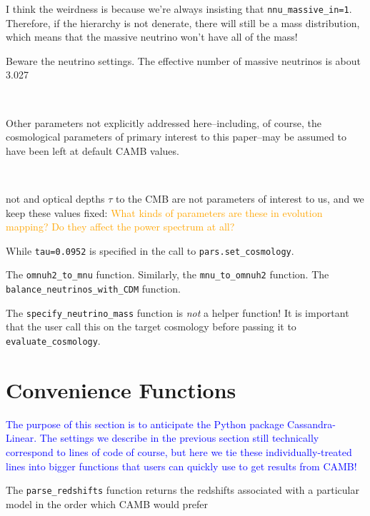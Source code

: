 I think the weirdness is because we're always
insisting that \verb|nnu_massive_in=1|. Therefore,
if the hierarchy is not denerate, there will still
be a mass distribution, which means that the 
massive neutrino won't have all of the mass!

Beware the neutrino settings. The effective number of massive neutrinos is about 3.027

\

Other parameters not explicitly addressed here--including, of course, the
cosmological parameters of primary interest to this paper--may be assumed to 
have been left at default CAMB values.

\

 not and optical depths $\tau$ to the CMB 
are not parameters of interest to us, and we keep these values fixed:
\textcolor{orange}{What kinds of parameters are these in evolution mapping?
Do they affect the power spectrum at all?}

While \verb|tau=0.0952| is specified in the call to \verb|pars.set_cosmology|.


The \verb|omnuh2_to_mnu| function. Similarly, the \verb|mnu_to_omnuh2|
function. The \verb|balance_neutrinos_with_CDM| function.


The \verb|specify_neutrino_mass| function is \textit{not} a helper function!
It is important that the user call this on the target cosmology before passing
it to \verb|evaluate_cosmology|.

\section{Convenience Functions}


\textcolor{blue}{The purpose of this section is to anticipate the Python
package Cassandra-Linear. The settings we describe in the previous section
still technically correspond to lines of code of course, but here we tie these
individually-treated lines into bigger functions that users can quickly use to
get results from CAMB!}



The \verb|parse_redshifts| function returns the redshifts associated with a
particular model in the order which CAMB would prefer

